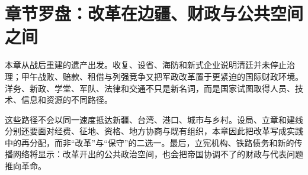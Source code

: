 \section{章节罗盘：改革在边疆、财政与公共空间之间}
\label{sec:late-qing-compass}

本章从战后重建的遗产出发。收复、设省、海防和新式企业说明清廷并未停止治理；甲午战败、赔款、租借与列强竞争又把军政改革置于更紧迫的国际财政环境。洋务、新政、学堂、军队、法律和交通不只是新名词，而是国家试图取得人员、技术、信息和资源的不同路径。

这些路径不会以同一速度抵达新疆、台湾、港口、城市与乡村。设局、立章和建线分别还要面对经费、征地、资格、地方协商与既有组织，本章因此把改革写成实践中的再分配，而非“改革”与“保守”的二选一。最后，立宪机构、铁路债务和新的传播网络将显示：改革开出的公共政治空间，也会把帝国协调不了的财政与代表问题推向革命。
